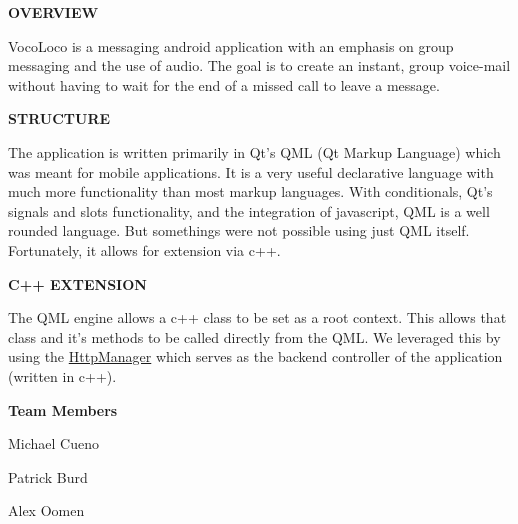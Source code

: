 {\bfseries O\-V\-E\-R\-V\-I\-E\-W}

Voco\-Loco is a messaging android application with an emphasis on group messaging and the use of audio. The goal is to create an instant, group voice-\/mail without having to wait for the end of a missed call to leave a message.

{\bfseries S\-T\-R\-U\-C\-T\-U\-R\-E}

The application is written primarily in Qt's Q\-M\-L (Qt Markup Language) which was meant for mobile applications. It is a very useful declarative language with much more functionality than most markup languages. With conditionals, Qt's signals and slots functionality, and the integration of javascript, Q\-M\-L is a well rounded language. But somethings were not possible using just Q\-M\-L itself. Fortunately, it allows for extension via c++.

{\bfseries C++ E\-X\-T\-E\-N\-S\-I\-O\-N}

The Q\-M\-L engine allows a c++ class to be set as a root context. This allows that class and it's methods to be called directly from the Q\-M\-L. We leveraged this by using the \hyperlink{classHttpManager}{Http\-Manager} which serves as the backend controller of the application (written in c++).

{\bfseries Team Members} 
\begin{DoxyItemize}
\item Michael Cueno 
\item Patrick Burd 
\item Alex Oomen 
\end{DoxyItemize}